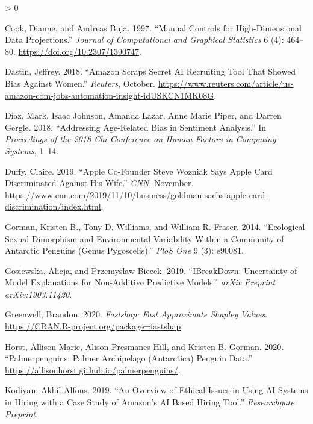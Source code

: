 \documentclass[
  article]{article}
\newlength{\cslhangindent}
\newenvironment{CSLReferences}[2] %
 {%
  \setlength{\parindent}{0pt}
  \ifodd #1 \everypar{\setlength{\hangindent}{\cslhangindent}}\ignorespaces\fi
  \ifnum #2 > 0
  \setlength{\parskip}{#2\baselineskip}
  \fi
 }%
 {}
\begin{document}
\begin{CSLReferences}{1}{0}
\leavevmode\hypertarget{ref-cook_manual_1997}{}%
Cook, Dianne, and Andreas Buja. 1997. {``Manual {Controls} for {High}-{Dimensional} {Data} {Projections}.''} \emph{Journal of Computational and Graphical Statistics} 6 (4): 464--80. \url{https://doi.org/10.2307/1390747}.

\leavevmode\hypertarget{ref-dastin_amazon_2018}{}%
Dastin, Jeffrey. 2018. {``Amazon Scraps Secret {AI} Recruiting Tool That Showed Bias Against Women.''} \emph{Reuters}, October. \url{https://www.reuters.com/article/us-amazon-com-jobs-automation-insight-idUSKCN1MK08G}.

\leavevmode\hypertarget{ref-diaz_addressing_2018}{}%
Díaz, Mark, Isaac Johnson, Amanda Lazar, Anne Marie Piper, and Darren Gergle. 2018. {``Addressing Age-Related Bias in Sentiment Analysis.''} In \emph{Proceedings of the 2018 Chi Conference on Human Factors in Computing Systems}, 1--14.

\leavevmode\hypertarget{ref-duffy_apple_2019}{}%
Duffy, Claire. 2019. {``Apple Co-Founder {Steve} {Wozniak} Says {Apple} {Card} Discriminated Against His Wife.''} \emph{CNN}, November. \url{https://www.cnn.com/2019/11/10/business/goldman-sachs-apple-card-discrimination/index.html}.

\leavevmode\hypertarget{ref-gorman_ecological_2014}{}%
Gorman, Kristen B., Tony D. Williams, and William R. Fraser. 2014. {``Ecological Sexual Dimorphism and Environmental Variability Within a Community of {Antarctic} Penguins (Genus {Pygoscelis}).''} \emph{PloS One} 9 (3): e90081.

\leavevmode\hypertarget{ref-gosiewska_ibreakdown_2019}{}%
Gosiewska, Alicja, and Przemyslaw Biecek. 2019. {``{IBreakDown}: {Uncertainty} of Model Explanations for Non-Additive Predictive Models.''} \emph{arXiv Preprint arXiv:1903.11420}.

\leavevmode\hypertarget{ref-greenwell_fastshap_2020}{}%
Greenwell, Brandon. 2020. \emph{Fastshap: {Fast} {Approximate} {Shapley} {Values}}. \url{https://CRAN.R-project.org/package=fastshap}.

\leavevmode\hypertarget{ref-horst_palmerpenguins_2020}{}%
Horst, Allison Marie, Alison Presmanes Hill, and Kristen B. Gorman. 2020. {``Palmerpenguins: {Palmer} {Archipelago} ({Antarctica}) Penguin Data.''} \url{https://allisonhorst.github.io/palmerpenguins/}.

\leavevmode\hypertarget{ref-kodiyan_overview_2019}{}%
Kodiyan, Akhil Alfons. 2019. {``An Overview of Ethical Issues in Using {AI} Systems in Hiring with a Case Study of {Amazon}'s {AI} Based Hiring Tool.''} \emph{Researchgate Preprint}.


\end{CSLReferences}
\end{document}
